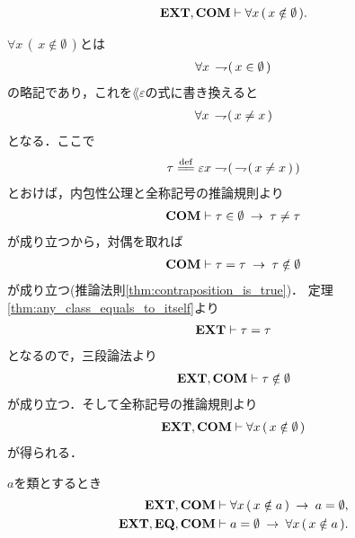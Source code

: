 	\begin{screen}
		\begin{thm}[空集合はいかなる集合も持たない]\label{thm:emptyset_has_nothing}
			\begin{align}
				\mbox{{\bf EXT}},\mbox{\bf COM} \vdash \forall x\, (\, x \notin \emptyset\, ).
			\end{align}
		\end{thm}
	\end{screen}
	
	\begin{sketch}
		$\forall x\, (\, x \notin \emptyset\, )$とは
		\begin{align}
			\forall x\, \rightharpoondown\hspace{-0.25em} (\, x \in \emptyset\, )
		\end{align}
		の略記であり，これを$\lang{\varepsilon}$の式に書き換えると
		\begin{align}
			\forall x\, \rightharpoondown\hspace{-0.25em} (\, x \neq x\, )
		\end{align}
		となる．ここで
		\begin{align}
			\tau \defeq \varepsilon x \negation (\, \negation (\, x \neq x\, )\, )
		\end{align}
		とおけば，内包性公理と全称記号の推論規則より
		\begin{align}
			\mbox{\bf COM} \vdash \tau \in \emptyset \hspace{0.25em}\rightarrow\hspace{0.25em} \tau \neq \tau
		\end{align}
		が成り立つから，対偶を取れば
		\begin{align}
			\mbox{\bf COM} \vdash \tau = \tau \hspace{0.25em}\rightarrow\hspace{0.25em} \tau \notin \emptyset
		\end{align}
		が成り立つ(推論法則\ref{thm:contraposition_is_true})．
		定理\ref{thm:any_class_equals_to_itself}より
		\begin{align}
			\mbox{{\bf EXT}} \vdash \tau = \tau
		\end{align}
		となるので，三段論法より
		\begin{align}
			\mbox{{\bf EXT}},\mbox{\bf COM} \vdash \tau \notin \emptyset
		\end{align}
		が成り立つ．そして全称記号の推論規則より
		\begin{align}
			\mbox{{\bf EXT}},\mbox{\bf COM} \vdash \forall x\, (\, x \notin \emptyset\, )
		\end{align}
		が得られる．
		\QED
	\end{sketch}
	
	\begin{screen}
		\begin{thm}[空の類は空集合に等しい]\label{thm:uniqueness_of_emptyset}
			$a$を類とするとき
			\begin{align}
				\mbox{{\bf EXT}},\mbox{\bf COM} &\vdash \forall x\, (\, x \notin a\, ) \hspace{0.25em}\rightarrow\hspace{0.25em} a = \emptyset, \\
				\mbox{{\bf EXT}},\mbox{{\bf EQ}},\mbox{\bf COM} &\vdash a = \emptyset \hspace{0.25em}\rightarrow\hspace{0.25em} \forall x\, (\, x \notin a\, ).
			\end{align}
		\end{thm}
	\end{screen}
	
